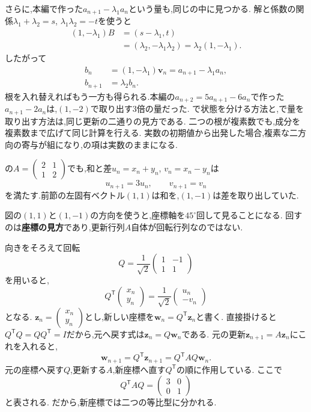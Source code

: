 さらに,本編で作った$a_{n+1}-\lambda_1a_n$という量も,同じの中に見つかる.
解と係数の関係$\lambda_1+\lambda_2=s$, $\lambda_1\lambda_2=-t$を使うと
\[
  \begin{aligned}
    (1,-\lambda_1)B
      &=(s-\lambda_1,t)\\
      &=(\lambda_2,-\lambda_1\lambda_2)
       =\lambda_2(1,-\lambda_1).
  \end{aligned}
\]
したがって
\[
  \begin{aligned}
    b_n&=(1,-\lambda_1)\boldsymbol{v}_n
         =a_{n+1}-\lambda_1a_n,\\
    b_{n+1}&=\lambda_2 b_n.
  \end{aligned}
\]
根を入れ替えればもう一方も得られる.本編の$a_{n+2}=5a_{n+1}-6a_n$で作った$a_{n+1}-2a_n$は,$(1,-2)$で取り出す$3$倍の量だった.
で状態を分ける方法と,で量を取り出す方法は,同じ更新の二通りの見方である.
二つの根が複素数でも,成分を複素数まで広げて同じ計算を行える.
実数の初期値から出発した場合,複素な二方向の寄与が組になり,の項は実数のままになる.

の$A=\begin{pmatrix}2&1\\1&2\end{pmatrix}$でも,和と差$u_n=x_n+y_n$, $v_n=x_n-y_n$は
\[
  u_{n+1}=3u_n,\qquad v_{n+1}=v_n
\]
を満たす.前節の左固有ベクトル$(1,1)$は和を,$(1,-1)$は差を取り出していた.

図の$(1,1)$と$(1,-1)$の方向を使うと,座標軸を$45^\circ$回して見ることになる.
回すのは\textbf{座標の見方}であり,更新行列$A$自体が回転行列なのではない.
  \BookFigSystem

向きをそろえて回転
\[
  Q=\frac{1}{\sqrt2}
  \begin{pmatrix}
    1&-1\\
    1&1
  \end{pmatrix}
\]
を用いると,
\[
  Q^{\mathsf T}
  \begin{pmatrix}x_n\\y_n\end{pmatrix}
  =\frac{1}{\sqrt2}
  \begin{pmatrix}u_n\\-v_n\end{pmatrix}
\]
となる.
$\boldsymbol z_n=\begin{pmatrix}x_n\\y_n\end{pmatrix}$とし,新しい座標を$\boldsymbol w_n=Q^{\mathsf T}\boldsymbol z_n$と書く.
直接掛けると$Q^{\mathsf T}Q=QQ^{\mathsf T}=I$だから,元へ戻す式は$\boldsymbol z_n=Q\boldsymbol w_n$である.
元の更新$\boldsymbol z_{n+1}=A\boldsymbol z_n$にこれを入れると,
\[
  \boldsymbol w_{n+1}
  =Q^{\mathsf T}\boldsymbol z_{n+1}
  =Q^{\mathsf T}AQ\boldsymbol w_n.
\]
元の座標へ戻す$Q$,更新する$A$,新座標へ直す$Q^{\mathsf T}$の順に作用している.
ここで
\[
  Q^{\mathsf T}AQ=
  \begin{pmatrix}3&0\\0&1\end{pmatrix}
\]
と表される.
だから,新座標では二つの等比型に分かれる.

